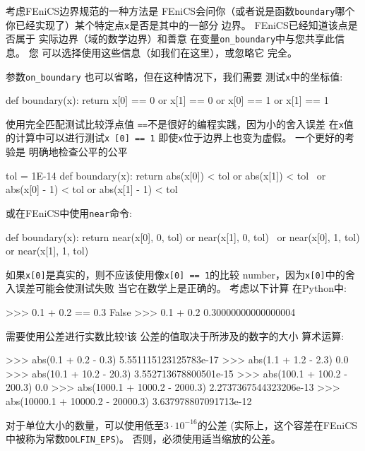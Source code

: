 考虑FEniCS边界规范的一种方法是
FEniCS会问你（或者说是函数\texttt{boundary}哪个
你已经实现了）某个特定点\texttt{x}是否是其中的一部分
边界。 FEniCS已经知道该点是否属于
实际边界（域的数学边界）和善意
在变量\verb!on_boundary!中与您共享此信息。 您
可以选择使用这些信息（如我们在这里），或忽略它
完全。

参数\verb!on_boundary! 也可以省略，但在这种情况下，我们需要
测试\texttt{x}中的坐标值:

\begin{python}
def boundary(x):
    return x[0] == 0 or x[1] == 0 or x[0] == 1 or x[1] == 1
\end{python}

使用完全匹配测试比较浮点值
\texttt{==}不是很好的编程实践，因为小的舍入误差
在\texttt{x}值的计算中可以进行测试\texttt{x [0] == 1}
即使\texttt{x}位于边界上也变为虚假。 一个更好的考验是
明确地检查公平的公平

\begin{python}
tol = 1E-14
def boundary(x):
    return abs(x[0]) < tol or abs(x[1]) < tol \
        or abs(x[0] - 1) < tol or abs(x[1] - 1) < tol
\end{python}
或在FEniCS中使用\texttt{near}命令:

\begin{python}
def boundary(x):
    return near(x[0], 0, tol) or near(x[1], 0, tol) \
        or near(x[0], 1, tol) or near(x[1], 1, tol)
\end{python}


\begin{notice}[不要使用\texttt{==}来比较实数!]
如果\texttt{x[0]}是真实的，则不应该使用像\texttt{x[0] == 1}的比较
number，因为\texttt{x[0]}中的舍入误差可能会使测试失败
当它在数学上是正确的。 考虑以下计算
在Python中:

\begin{python}
>>> 0.1 + 0.2 == 0.3
False
>>> 0.1 + 0.2
0.30000000000000004
\end{python}

需要使用公差进行实数比较!该
公差的值取决于所涉及的数字的大小
算术运算:

\begin{python}
>>> abs(0.1 + 0.2 - 0.3)
5.551115123125783e-17
>>> abs(1.1 + 1.2 - 2.3)
0.0
>>> abs(10.1 + 10.2 - 20.3)
3.552713678800501e-15
>>> abs(100.1 + 100.2 - 200.3)
0.0
>>> abs(1000.1 + 1000.2 - 2000.3)
2.2737367544323206e-13
>>> abs(10000.1 + 10000.2 - 20000.3)
3.637978807091713e-12
\end{python}
对于单位大小的数量，可以使用低至$3\cdot 10^{-16}$的公差
(实际上，这个容差在FEniCS中被称为常数\verb!DOLFIN_EPS!)。
否则，必须使用适当缩放的公差。
\end{notice}

